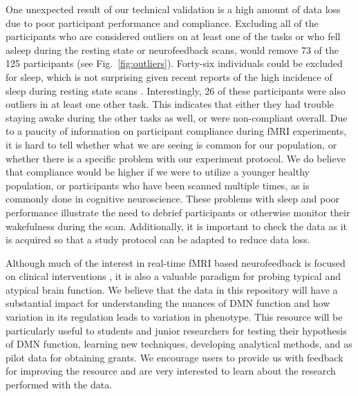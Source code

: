 One unexpected result of our technical validation is a high amount of data loss due to poor participant performance and compliance. Excluding all of the participants who are considered outliers on at least one of the tasks or who fell asleep during the resting state or neurofeedback scans, would remove 73 of the 125 participants (see Fig.~\ref{fig:outliers}). Forty-six individuals could be excluded for sleep, which is not surprising given recent reports of the high incidence of sleep during resting state scans \cite{Tagliazucchi2014}. Interestingly, 26 of these participants were also outliers in at least one other task. This indicates that either they had trouble staying awake during the other tasks as well, or were non-compliant overall. Due to a paucity of information on participant compliance during fMRI experiments, it is hard to tell whether what we are seeing is common for our population, or whether there is a specific problem with our experiment protocol. We do believe that compliance would be higher if we were to utilize a younger healthy population, or participants who have been scanned multiple times, as is commonly done in cognitive neuroscience. These problems with sleep and poor performance illustrate the need to debrief participants or otherwise monitor their wakefulness during the scan. Additionally, it is important to check the data as it is acquired so that a study protocol can be adapted to reduce data loss.

Although much of the interest in real-time fMRI based neurofeedback is focused on clinical interventions \cite{Stoeckel2014}, it is also a valuable paradigm for probing typical and atypical brain function. We believe that the data in this repository will have a substantial impact for understanding the nuances of DMN function and how variation in its regulation leads to variation in phenotype. This resource will be particularly useful to students and junior researchers for testing their hypothesis of DMN function, learning new techniques, developing analytical methods, and as pilot data for obtaining grants. We encourage users to provide us with feedback for improving the resource and are very interested to learn about the research performed with the data.
